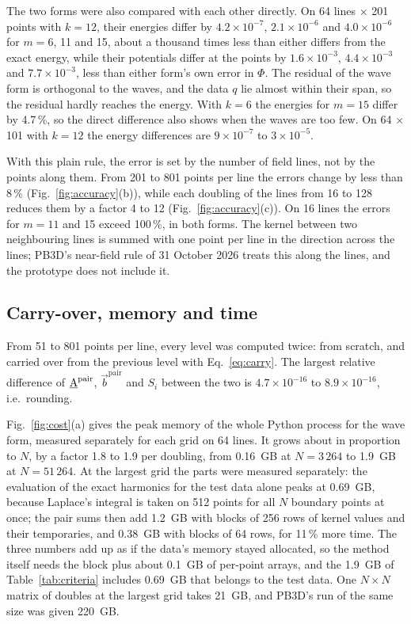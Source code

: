\documentclass[%
 aip,
 rsi,%
 amsmath,amssymb,
 reprint,%
]{revtex4-1}
\begin{document}
The two forms were also compared with each other directly.
On 64 lines $\times$ 201 points with $k = 12$, their energies differ by $4.2\times10^{-7}$, $2.1\times10^{-6}$ and $4.0\times10^{-6}$ for $m = 6$, 11 and 15, about a thousand times less than either differs from the exact energy, while their potentials differ at the points by $1.6\times10^{-3}$, $4.4\times10^{-3}$ and $7.7\times10^{-3}$, less than either form's own error in $\Phi$.
The residual of the wave form is orthogonal to the waves, and the data $q$ lie almost within their span, so the residual hardly reaches the energy.
With $k = 6$ the energies for $m = 15$ differ by 4.7\,\%, so the direct difference also shows when the waves are too few.
On 64 $\times$ 101 with $k = 12$ the energy differences are $9\times10^{-7}$ to $3\times10^{-5}$.

With this plain rule, the error is set by the number of field lines, not by the points along them.
From 201 to 801 points per line the errors change by less than 8\,\% (Fig.~\ref{fig:accuracy}(b)), while each doubling of the lines from 16 to 128 reduces them by a factor 4 to 12 (Fig.~\ref{fig:accuracy}(c)).
On 16 lines the errors for $m = 11$ and 15 exceed 100\,\%, in both forms.
The kernel between two neighbouring lines is summed with one point per line in the direction across the lines; PB3D's near-field rule of 31 October 2026 treats this along the lines, and the prototype does not include it.

\subsection{Carry-over, memory and time}
From 51 to 801 points per line, every level was computed twice: from scratch, and carried over from the previous level with Eq.~\eqref{eq:carry}.
The largest relative difference of $\underline{\mathrm{A}}^\text{pair}$, $\vec{b}^\text{pair}$ and $S_i$ between the two is $4.7\times10^{-16}$ to $8.9\times10^{-16}$, i.e.\ rounding.

Fig.~\ref{fig:cost}(a) gives the peak memory of the whole Python process for the wave form, measured separately for each grid on 64 lines.
It grows about in proportion to $N$, by a factor 1.8 to 1.9 per doubling, from 0.16~GB at $N = 3\,264$ to 1.9~GB at $N = 51\,264$.
At the largest grid the parts were measured separately: the evaluation of the exact harmonics for the test data alone peaks at 0.69~GB, because Laplace's integral is taken on 512 points for all $N$ boundary points at once; the pair sums then add 1.2~GB with blocks of 256 rows of kernel values and their temporaries, and 0.38~GB with blocks of 64 rows, for 11\,\% more time.
The three numbers add up as if the data's memory stayed allocated, so the method itself needs the block plus about 0.1~GB of per-point arrays, and the 1.9~GB of Table~\ref{tab:criteria} includes 0.69~GB that belongs to the test data.
One $N\times N$ matrix of doubles at the largest grid takes 21~GB, and PB3D's run of the same size was given 220~GB.
\end{document}
